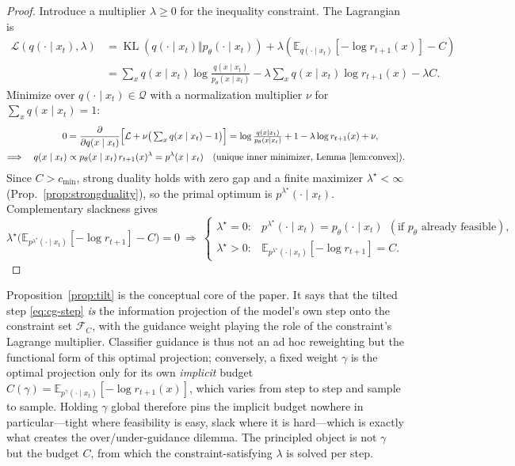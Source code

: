 \documentclass{article}
\DeclareMathOperator{\KL}{KL}
\newcommand{\E}{\mathbb{E}}
\newcommand{\Q}{\mathcal{Q}}
\newcommand{\lstar}{\lambda^{\star}}
\begin{document}
\begin{proof}
Introduce a multiplier $\lambda\ge 0$ for the inequality constraint. The Lagrangian is
\begin{equation}
\label{eq:lagrangian}
\begin{aligned}
\mathcal{L}(q(\cdot\mid x_t),\lambda)
&=\KL(q(\cdot\mid x_t)\Vert p_\theta(\cdot\mid x_t))+\lambda\!\left(\E_{q(\cdot\mid x_t)}[-\log r_{t+1}(x)]-C\right)\\
&=\sum_x q(x\mid x_t)\log\frac{q(x\mid x_t)}{p_\theta(x\mid x_t)}
-\lambda\sum_x q(x\mid x_t)\log r_{t+1}(x)-\lambda C.
\end{aligned}
\end{equation}
Minimize over $q(\cdot\mid x_t)\in\Q$ with a normalization multiplier $\nu$ for $\sum_x q(x\mid x_t)=1$:
\begin{align*}
0&=\frac{\partial}{\partial q(x\mid x_t)}\Big[\mathcal L+\nu\big(\textstyle\sum_x q(x\mid x_t)-1\big)\Big]
  =\log\frac{q(x\mid x_t)}{p_\theta(x\mid x_t)}+1-\lambda\log r_{t+1}(x)+\nu,\\
\Longrightarrow\quad q(x\mid x_t)&\propto p_\theta(x\mid x_t)\,r_{t+1}(x)^{\lambda}=p^{\lambda}(x\mid x_t)
  \quad\text{(unique inner minimizer, Lemma~\ref{lem:convex})}.
\end{align*}
Since $C>c_{\min}$, strong duality holds with zero gap and a finite maximizer $\lstar<\infty$ (Prop.~\ref{prop:strongduality}), so the primal optimum is $p^{\lstar}(\cdot\mid x_t)$. Complementary slackness gives
\begin{equation*}
\lstar\big(\E_{p^{\lstar}(\cdot\mid x_t)}[-\log r_{t+1}]-C\big)=0
\ \Longrightarrow\
\begin{cases}
\lstar=0: & p^{\lstar}(\cdot\mid x_t)=p_\theta(\cdot\mid x_t)\ \ (\text{if }p_\theta\text{ already feasible}),\\[2pt]
\lstar>0: & \E_{p^{\lstar}(\cdot\mid x_t)}[-\log r_{t+1}]=C.
\end{cases}
\end{equation*}
\end{proof}

Proposition~\ref{prop:tilt} is the conceptual core of the paper. It says that the tilted step \eqref{eq:cg-step} \emph{is} the information projection of the model's own step onto the constraint set $\mathcal F_C$, with the guidance weight playing the role of the constraint's Lagrange multiplier. Classifier guidance is thus not an ad hoc reweighting but the functional form of this optimal projection; conversely, a fixed weight $\gamma$ is the optimal projection only for its own \emph{implicit} budget $C(\gamma)=\E_{p^{\gamma}(\cdot\mid x_t)}[-\log r_{t+1}(x)]$, which varies from step to step and sample to sample. Holding $\gamma$ global therefore pins the implicit budget nowhere in particular---tight where feasibility is easy, slack where it is hard---which is exactly what creates the over/under-guidance dilemma. The principled object is not $\gamma$ but the budget $C$, from which the constraint-satisfying $\lambda$ is solved per step.
\end{document}

